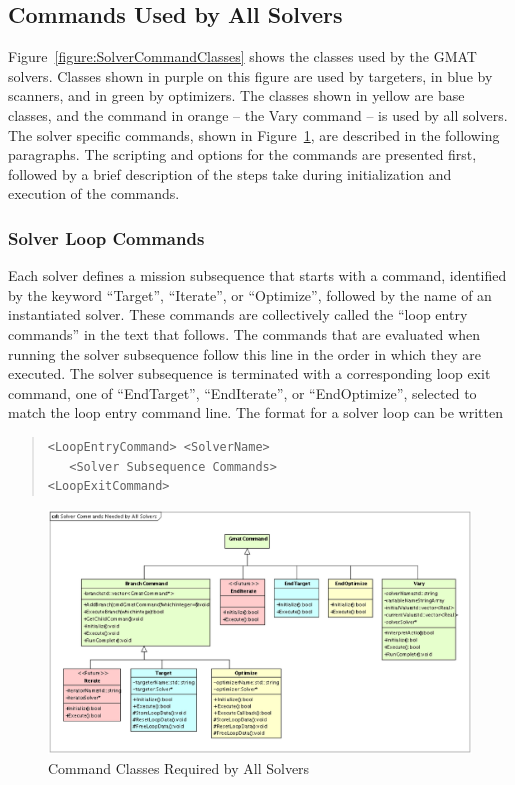 \subsection{\label{section:SolverCommandDescriptions}Commands Used by All Solvers}

Figure~\ref{figure:SolverCommandClasses} shows the classes used by the GMAT solvers.  Classes shown
in purple on this figure are used by targeters, in blue by scanners, and in green by optimizers.
The classes shown in yellow are base classes, and the command in orange -- the Vary command --
is used by all solvers. The solver specific commands, shown in
Figure~\ref{figure:SolverCommandsCommon}, are described in the following paragraphs.  The scripting
and options for the commands are presented first, followed by a brief description of the steps take
during initialization and execution of the commands.

\subsubsection{Solver Loop Commands}

Each solver defines a mission subsequence that starts with a command, identified by the keyword
``Target'', ``Iterate'', or ``Optimize'', followed by the name of an instantiated solver.  These
commands are collectively called the ``loop entry commands'' in the text that follows.  The commands
that are evaluated when running the solver subsequence follow this line in the order in which they
are executed.  The solver subsequence is terminated with a corresponding loop exit command, one of
``EndTarget'', ``EndIterate'', or ``EndOptimize'', selected to match the loop entry command line.
The format for a solver loop can be written

\begin{quote}
\begin{verbatim}
<LoopEntryCommand> <SolverName>
   <Solver Subsequence Commands>
<LoopExitCommand>
\end{verbatim}
\end{quote}

\begin{figure}
\begin{center}
\includegraphics[scale=0.45]{Images/SolverCommandsNeededbyAllSolvers.eps}
\caption{\label{figure:SolverCommandsCommon}Command Classes Required by All Solvers}
\end{center}
\end{figure}

